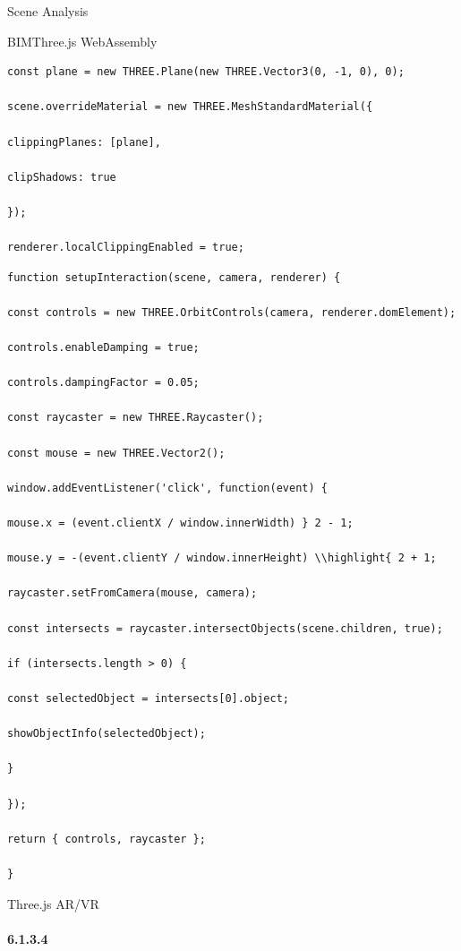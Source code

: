 Scene Analysis

BIMThree.js WebAssembly

\begin{lstlisting}[style=javascript]
const plane = new THREE.Plane(new THREE.Vector3(0, -1, 0), 0);

scene.overrideMaterial = new THREE.MeshStandardMaterial({

clippingPlanes: [plane],

clipShadows: true

});

renderer.localClippingEnabled = true;
\end{lstlisting}

\begin{lstlisting}[style=javascript]
function setupInteraction(scene, camera, renderer) {

const controls = new THREE.OrbitControls(camera, renderer.domElement);

controls.enableDamping = true;

controls.dampingFactor = 0.05;

const raycaster = new THREE.Raycaster();

const mouse = new THREE.Vector2();

window.addEventListener('click', function(event) {

mouse.x = (event.clientX / window.innerWidth) } 2 - 1;

mouse.y = -(event.clientY / window.innerHeight) \\highlight{ 2 + 1;

raycaster.setFromCamera(mouse, camera);

const intersects = raycaster.intersectObjects(scene.children, true);

if (intersects.length > 0) {

const selectedObject = intersects[0].object;

showObjectInfo(selectedObject);

}

});

return { controls, raycaster };

}
\end{lstlisting}

Three.js AR/VR

\hypertarget{section-30}{%
\paragraph{6.1.3.4}\label{section-30}}


